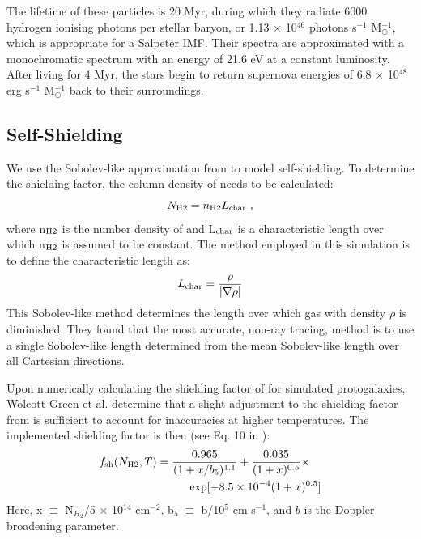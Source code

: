 \documentclass[a4paper,fleqn,usenatbib]{mnras}
\begin{document}
The lifetime of these particles is 20 Myr, during which they radiate 6000 hydrogen ionising photons per stellar baryon, or 1.13 $\times$ 10$^{46}$ photons s$^{-1}$ M$_{\odot}^{-1}$, which is appropriate for a Salpeter IMF. Their spectra are approximated with a monochromatic spectrum with an energy of 21.6 eV at a constant luminosity. After living for 4 Myr, the stars begin to return supernova energies of 6.8 $\times$ 10$^{48}$ erg s$^{-1}$ M$_{\odot}^{-1}$ back to their surroundings.

\subsection{\hh{} Self-Shielding}
We use the Sobolev-like approximation from \citet{Wolcott11} to model \hh{} self-shielding. To determine the \hh{} shielding factor, the column density of \hh{} needs to be calculated:
\begin{equation} \label{Nh2}
	N_{\rm H2} = n_{\rm H2}L_{\rm char} \ ,
\end{equation}
where n$_{\rm H2}$ is the number density of \hh{} and L$_{\rm char}$ is a characteristic length over which n$_{\rm H2}$ is assumed to be constant. The method employed in this simulation is to define the characteristic length as:
\begin{equation} \label{Lchar}
	L_{\rm char} = \frac{\rho}{|\nabla \rho|}
\end{equation}
This Sobolev-like method determines the length over which gas with density $\rho$ is diminished. They found that the most accurate, non-ray tracing, method is to use a single Sobolev-like length determined from the mean Sobolev-like length over all Cartesian directions. 

Upon numerically calculating the shielding factor of \hh{} for simulated protogalaxies, Wolcott-Green et al. determine that a slight adjustment to the shielding factor from \citet{Draine96} is sufficient to account for inaccuracies at higher temperatures. The implemented shielding factor is then (see Eq. 10 in \citet{Wolcott11}):
\begin{equation} \label{shield}
	\begin{multlined}
	f_{\rm sh}(N_{\rm H2}, T) = \frac{0.965}{(1+x/b_{5})^{1.1}} + \frac{0.035}{(1+x)^{0.5}}  \times \\ \exp [-8.5 \times 10^{-4} (1+x)^{0.5}]
	\end{multlined}
\end{equation}
Here, x $\equiv$ N$_{H_{2}}$/5 $\times$ 10$^{14}$ cm$^{-2}$, b$_{5}$ $\equiv$ b/10$^{5}$ cm s$^{-1}$, and $b$ is the Doppler broadening parameter.
\end{document}
